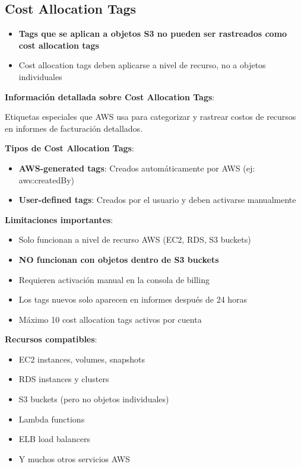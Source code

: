 \documentclass[12pt,a4paper]{report}
\newcommand{\important}[1]{\textcolor{dangerred}{\textbf{#1}}}
\begin{document}
\subsection{Cost Allocation Tags}

\begin{itemize}
    \item \important{Tags que se aplican a objetos S3 no pueden ser rastreados como cost allocation tags}
    \item Cost allocation tags deben aplicarse a nivel de recurso, no a objetos individuales
\end{itemize}

\textbf{Información detallada sobre Cost Allocation Tags}:

\begin{conceptbox}
Etiquetas especiales que AWS usa para categorizar y rastrear costos de recursos en informes de facturación detallados.
\end{conceptbox}

\textbf{Tipos de Cost Allocation Tags}:
\begin{itemize}
    \item \textbf{AWS-generated tags}: Creados automáticamente por AWS (ej: aws:createdBy)
    \item \textbf{User-defined tags}: Creados por el usuario y deben activarse manualmente
\end{itemize}

\textbf{Limitaciones importantes}:
\begin{itemize}
    \item Solo funcionan a nivel de recurso AWS (EC2, RDS, S3 buckets)
    \item \important{NO funcionan con objetos dentro de S3 buckets}
    \item Requieren activación manual en la consola de billing
    \item Los tags nuevos solo aparecen en informes después de 24 horas
    \item Máximo 10 cost allocation tags activos por cuenta
\end{itemize}

\textbf{Recursos compatibles}:
\begin{itemize}
    \item EC2 instances, volumes, snapshots
    \item RDS instances y clusters
    \item S3 buckets (pero no objetos individuales)
    \item Lambda functions
    \item ELB load balancers
    \item Y muchos otros servicios AWS
\end{itemize}
\end{document}
